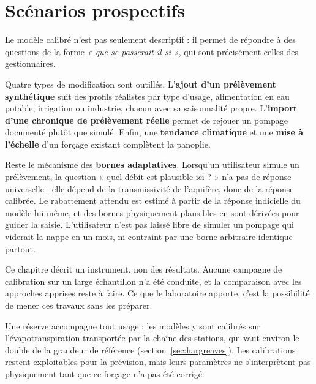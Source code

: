 \section{Scénarios prospectifs}

Le modèle calibré n'est pas seulement descriptif : il permet de répondre à des questions de la
forme \emph{« que se passerait-il si »}, qui sont précisément celles des gestionnaires.

Quatre types de modification sont outillés. L'\textbf{ajout d'un prélèvement synthétique} suit
des profils réalistes par type d'usage, alimentation en eau potable, irrigation ou industrie,
chacun avec sa saisonnalité propre. L'\textbf{import d'une chronique de prélèvement réelle}
permet de rejouer un pompage documenté plutôt que simulé. Enfin, une \textbf{tendance climatique}
et une \textbf{mise à l'échelle} d'un forçage existant complètent la panoplie.

Reste le mécanisme des \textbf{bornes adaptatives}. Lorsqu'un utilisateur
simule un prélèvement, la question « quel débit est plausible ici ? » n'a pas de réponse
universelle : elle dépend de la transmissivité de l'aquifère, donc de la réponse calibrée. Le
rabattement attendu est estimé à partir de la réponse indicielle du modèle lui-même, et des
bornes physiquement plausibles en sont dérivées pour guider la saisie. L'utilisateur n'est pas
laissé libre de simuler un pompage qui viderait la nappe en un mois, ni contraint par une borne
arbitraire identique partout.

Ce chapitre décrit un instrument, non des résultats. Aucune campagne de calibration sur un large
échantillon n'a été conduite, et la comparaison avec les approches apprises reste à faire. Ce
que le laboratoire apporte, c'est la possibilité de mener ces travaux sans les préparer.

Une réserve accompagne tout usage : les modèles y sont calibrés sur l'évapotranspiration
transportée par la chaîne des stations, qui vaut environ le double de la grandeur de référence
(section~\ref{sec:hargreaves}). Les calibrations restent exploitables pour la prévision, mais
leurs paramètres ne s'interprètent pas physiquement tant que ce forçage n'a pas été corrigé.
